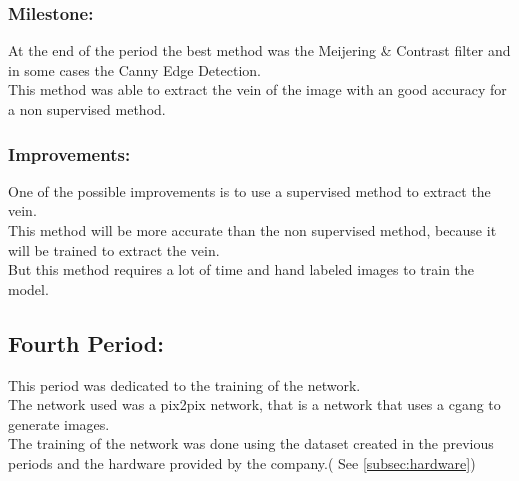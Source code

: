 \subsubsection{Milestone:}
At the end of the period the best method was the Meijering \& Contrast filter and in some cases the Canny Edge Detection.\\
This method was able to extract the vein of the image with an good accuracy for a non supervised method.\\
\subsubsection{Improvements:}
One of the possible improvements is to use a supervised method to extract the vein.\\
This method will be more accurate than the non supervised method, because it will be trained to extract the vein.\\
But this method requires a lot of time and hand labeled images to train the model.
\subsection{Fourth Period:}
This period was dedicated to the training of the network.\\
The network used was a pix2pix network, that is a network that uses a \gls{cgang} to generate images.\\
The training of the network was done using the dataset created in the previous periods and the hardware provided by the company.( See \ref{subsec:hardware})\\


